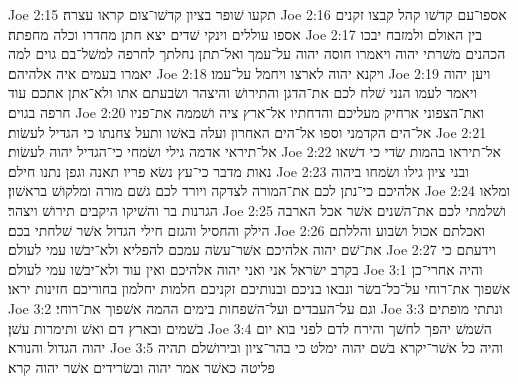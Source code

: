 Joe 2:15  תקעו שׁופר בציון קדשׁו־צום קראו עצרה׃
Joe 2:16  אספו־עם קדשׁו קהל קבצו זקנים אספו עוללים וינקי שׁדים יצא חתן מחדרו וכלה מחפתה׃
Joe 2:17  בין האולם ולמזבח יבכו הכהנים משׁרתי יהוה ויאמרו חוסה יהוה על־עמך ואל־תתן נחלתך לחרפה למשׁל־בם גוים למה יאמרו בעמים איה אלהיהם׃
Joe 2:18  ויקנא יהוה לארצו ויחמל על־עמו׃
Joe 2:19  ויען יהוה ויאמר לעמו הנני שׁלח לכם את־הדגן והתירושׁ והיצהר ושׂבעתם אתו ולא־אתן אתכם עוד חרפה בגוים׃
Joe 2:20  ואת־הצפוני ארחיק מעליכם והדחתיו אל־ארץ ציה ושׁממה את־פניו אל־הים הקדמני וספו אל־הים האחרון ועלה באשׁו ותעל צחנתו כי הגדיל לעשׂות׃
Joe 2:21  אל־תיראי אדמה גילי ושׂמחי כי־הגדיל יהוה לעשׂות׃
Joe 2:22  אל־תיראו בהמות שׂדי כי דשׁאו נאות מדבר כי־עץ נשׂא פריו תאנה וגפן נתנו חילם׃
Joe 2:23  ובני ציון גילו ושׂמחו ביהוה אלהיכם כי־נתן לכם את־המורה לצדקה ויורד לכם גשׁם מורה ומלקושׁ בראשׁון׃
Joe 2:24  ומלאו הגרנות בר והשׁיקו היקבים תירושׁ ויצהר׃
Joe 2:25  ושׁלמתי לכם את־השׁנים אשׁר אכל הארבה הילק והחסיל והגזם חילי הגדול אשׁר שׁלחתי בכם׃
Joe 2:26  ואכלתם אכול ושׂבוע והללתם את־שׁם יהוה אלהיכם אשׁר־עשׂה עמכם להפליא ולא־יבשׁו עמי לעולם׃
Joe 2:27  וידעתם כי בקרב ישׂראל אני ואני יהוה אלהיכם ואין עוד ולא־יבשׁו עמי לעולם׃
Joe 3:1  והיה אחרי־כן אשׁפוך את־רוחי על־כל־בשׂר ונבאו בניכם ובנותיכם זקניכם חלמות יחלמון בחוריכם חזינות יראו׃
Joe 3:2  וגם על־העבדים ועל־השׁפחות בימים ההמה אשׁפוך את־רוחי׃
Joe 3:3  ונתתי מופתים בשׁמים ובארץ דם ואשׁ ותימרות עשׁן׃
Joe 3:4  השׁמשׁ יהפך לחשׁך והירח לדם לפני בוא יום יהוה הגדול והנורא׃
Joe 3:5  והיה כל אשׁר־יקרא בשׁם יהוה ימלט כי בהר־ציון ובירושׁלם תהיה פליטה כאשׁר אמר יהוה ובשׂרידים אשׁר יהוה קרא׃


